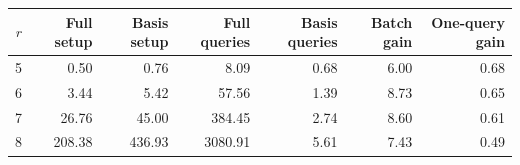 \begin{tabular}{rrrrrrr}
\toprule
$r$ & Full setup & Basis setup & Full queries & Basis queries & Batch gain & One-query gain \\
\midrule
5 & 0.50 & 0.76 & 8.09 & 0.68 & 6.00 & 0.68 \\
6 & 3.44 & 5.42 & 57.56 & 1.39 & 8.73 & 0.65 \\
7 & 26.76 & 45.00 & 384.45 & 2.74 & 8.60 & 0.61 \\
8 & 208.38 & 436.93 & 3080.91 & 5.61 & 7.43 & 0.49 \\
\bottomrule
\end{tabular}
